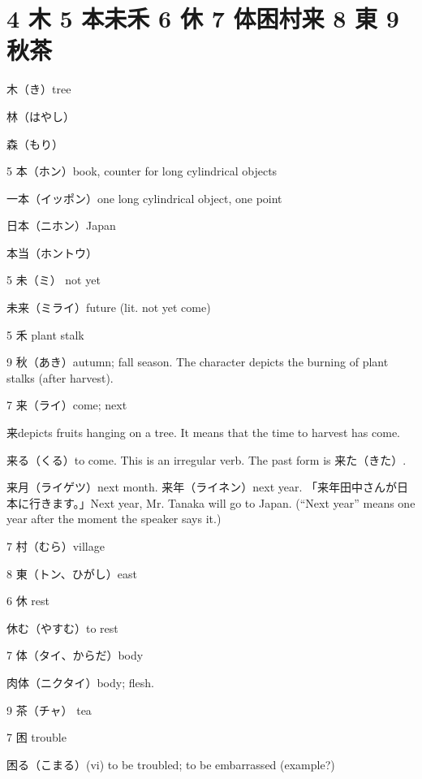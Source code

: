 \section{4 木 5 本未禾 6 休 7 体困村来 8 東 9 秋茶}

木（き）tree

林（はやし）

森（もり）

5 本（ホン）book, counter for long cylindrical objects

一本（イッポン）one long cylindrical object, one point

日本（ニホン）Japan

本当（ホントウ）

5 未（ミ） not yet

未来（ミライ）future (lit. not yet come)

5 禾 plant stalk

9 秋（あき）autumn; fall season.
The character depicts the burning of plant stalks (after harvest).

7 来（ライ）come; next

来depicts fruits hanging on a tree.
It means that the time to harvest has come.

来る（くる）to come. This is an irregular verb. The past form is 来た（きた）.

来月（ライゲツ）next month.
来年（ライネン）next year.
「来年田中さんが日本に行きます。」Next year, Mr. Tanaka will go to Japan.
(``Next year'' means one year after the moment the speaker says it.)

7 村（むら）village

8 東（トン、ひがし）east

6 休 rest

休む（やすむ）to rest

7 体（タイ、からだ）body

肉体（ニクタイ）body; flesh.

9 茶（チャ） tea

7 困 trouble

困る（こまる）(vi) to be troubled; to be embarrassed
(example?)
